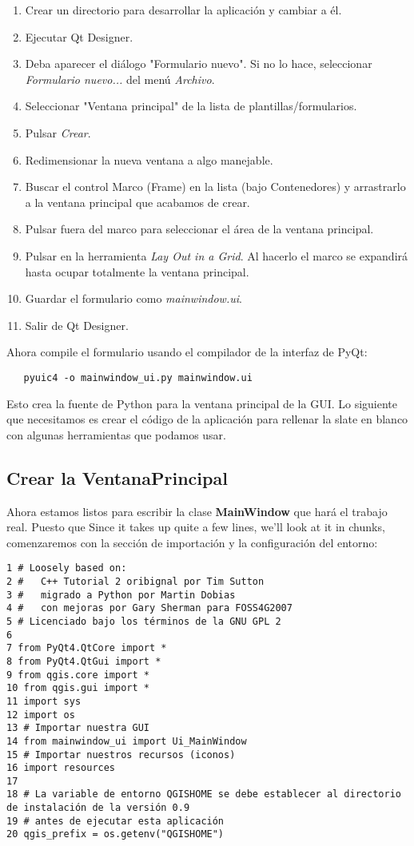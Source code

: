\begin{enumerate}
\item Crear un directorio para desarrollar la aplicación y cambiar a él.
\item Ejecutar Qt Designer.
\item Deba aparecer el diálogo "Formulario nuevo". Si no lo hace, seleccionar 
\textsl{Formulario nuevo...} del menú \textsl{Archivo}.
\item Seleccionar "Ventana principal" de la lista de plantillas/formularios.
\item Pulsar \textsl{Crear}.
\item Redimensionar la nueva ventana a algo manejable.
\item Buscar el control Marco (Frame) en la lista (bajo Contenedores) y arrastrarlo a la ventana principal
que acabamos de crear.
\item Pulsar fuera del marco para seleccionar el área de la ventana principal.
\item Pulsar en la herramienta \textsl{Lay Out in a Grid}. Al hacerlo el marco se expandirá hasta
ocupar totalmente la ventana principal.
\item Guardar el formulario como \textsl{mainwindow.ui}.
\item Salir de Qt Designer.
\end{enumerate} 

Ahora compile el formulario usando el compilador de la interfaz de PyQt:

\begin{verbatim}
   pyuic4 -o mainwindow_ui.py mainwindow.ui
\end{verbatim}

Esto crea la fuente de Python para la ventana principal de la GUI. Lo siguiente que necesitamos es crear
el código de la aplicación para rellenar la slate en blanco con algunas herramientas que podamos usar.

\subsection{Crear la VentanaPrincipal}

Ahora estamos listos para escribir la clase \textbf{MainWindow} que hará el trabajo real. Puesto que
Since it takes up quite a few lines, we'll look at it in chunks, comenzaremos con la sección de
importación y la configuración del entorno:

\begin{verbatim}
1 # Loosely based on:
2 #   C++ Tutorial 2 oribignal por Tim Sutton
3 #   migrado a Python por Martin Dobias
4 #   con mejoras por Gary Sherman para FOSS4G2007
5 # Licenciado bajo los términos de la GNU GPL 2
6
7 from PyQt4.QtCore import *
8 from PyQt4.QtGui import *
9 from qgis.core import *
10 from qgis.gui import *
11 import sys
12 import os
13 # Importar nuestra GUI
14 from mainwindow_ui import Ui_MainWindow
15 # Importar nuestros recursos (iconos)
16 import resources
17 
18 # La variable de entorno QGISHOME se debe establecer al directorio de instalación de la versión 0.9
19 # antes de ejecutar esta aplicación
20 qgis_prefix = os.getenv("QGISHOME")
\end{verbatim}

